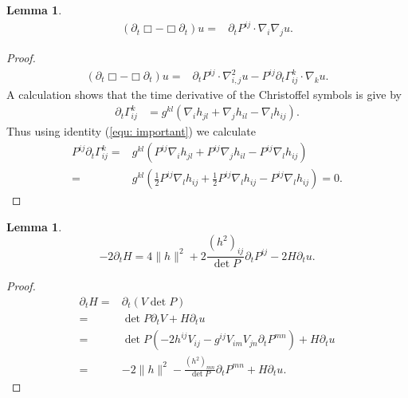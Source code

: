 \documentclass{amsart}
\newtheorem{lemma}[theorem]{Lemma}
\theoremstyle{definition}
\theoremstyle{remark}
\numberwithin{equation}{section}
\begin{document}
\begin{lemma}
\begin{align}
(\partial_t \Box-\Box\partial_t) u=&\partial_tP^{ij}\cdot\nabla_i\nabla_ju.
\end{align}
\end{lemma}
\begin{proof}
\begin{align*}
(\partial_t \Box-\Box \partial_t)u
=&\partial_tP^{ij}\cdot\nabla^2_{i,j}u-P^{ij}\partial_t\Gamma_{ij}^k\cdot\nabla_ku.
\end{align*}
A calculation shows that the time derivative of the Christoffel symbols is give by
\begin{align}
\partial_t \Gamma_{ij}^k&=g^{kl}\left(\nabla_ih_{jl}+\nabla_jh_{il}-\nabla_{l}h_{ij}\right).
\end{align}
Thus using identity (\ref{equ: important}) we calculate
\begin{align*}
P^{ij}\partial_t \Gamma_{ij}^k=&g^{kl}\left(P^{ij}\nabla_ih_{jl}+P^{ij}\nabla_jh_{il}-P^{ij}\nabla_{l}h_{ij}\right)\\
=&g^{kl}\left(\frac{1}{2}P^{ij}\nabla_lh_{ij}+\frac{1}{2}P^{ij}\nabla_lh_{ij}-P^{ij}\nabla_{l}h_{ij}\right)=0.
\end{align*}
\end{proof}
\begin{lemma}
\begin{equation}
-2\partial_tH=4\|h\|^2+2\frac{(h^2)_{ij}}{\det P}\partial_tP^{ij}-2H\partial_tu.
\end{equation}
\end{lemma}
\begin{proof}
\begin{align*}
\partial_tH=&\partial_t(V\det P)\\
=&\det P\partial_t V+H\partial_tu\\
=&\det P(-2h^{ij}V_{ij}-g^{ij}V_{im}V_{jn}\partial_tP^{mn})+H\partial_tu\\
=&-2\|h\|^2-\frac{(h^2)_{mn}}{\det P}\partial_tP^{mn}+H\partial_tu.
\end{align*}
\end{proof}
\end{document}

